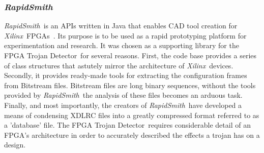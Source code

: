 \documentclass[conference]{IEEEtran}
\newcommand{\Xilinx}{\textit{\gls{Xilinx}}~}
\newcommand{\Name}{\acrshort{FPGA} Trojan Detector}
\newcommand{\NameNoPeriod}{\Name~}
\newcommand{\RapidSmith}{\textit{RapidSmith}~}
\begin{document}
\subsubsection{\textit{RapidSmith}} \label{sec:rapidSmith}
\RapidSmith is an \acrshort{APIs} written in Java that enables \acrfull{CAD} tool creation for \Xilinx \acrshort{FPGA}s~\cite{rapidSmith}.
Its purpose is to be used as a rapid prototyping platform for experimentation and research.
It was chosen as a supporting library for the \NameNoPeriod for several reasons.
First, the code base provides a series of class structures that astutely mirror the architecture of \Xilinx devices.
Secondly, it provides ready-made tools for extracting the configuration frames from \gls{Bitstream} files. 
\gls{Bitstream} files are long binary sequences, without the tools provided by \RapidSmith the analysis of these files becomes an arduous task.
Finally, and most importantly, the creators of \RapidSmith have developed a means of condensing XDLRC files into a greatly compressed format referred to as a 'database' file.
The \NameNoPeriod requires considerable detail of an \acrshort{FPGA}'s architecture in order to accurately described the effects a trojan has on a design.
\end{document}
